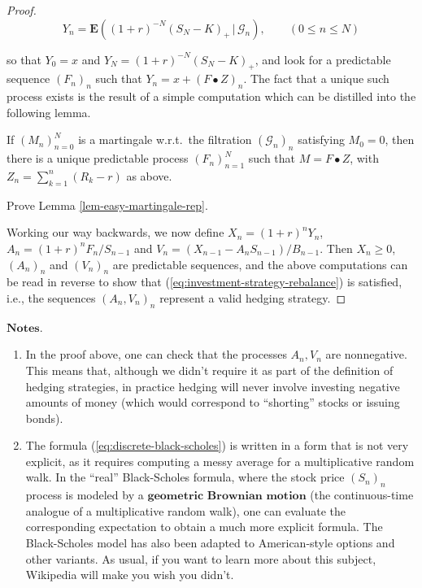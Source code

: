 \begin{proof}
\[
Y_n = \mathbf{E}\left((1+r)^{-N}(S_N-K)_+\,|\,\mathcal{G}_n\right), \qquad (0\le n\le N)
\]

\noindent so that $Y_0 = x$ and $Y_N = (1+r)^{-N} (S_N-K)_+$,
and look for a predictable sequence $(F_n)_n$ such
that $Y_n = x + (F\bullet Z)_n$. The fact that a
unique such process exists is the result of a simple
computation which can be distilled into the following
lemma.

\begin{lem}
\label{lem-easy-martingale-rep}
If $(M_n)_{n=0}^N$ is a martingale w.r.t.\ the
filtration $(\mathcal{G}_n)_n$ satisfying $M_0 = 0$,
then there is a unique predictable process
$(F_n)_{n=1}^N$ such that $M = F\bullet Z$, with
$Z_n=\sum_{k=1}^n (R_k-r)$ as above.
\end{lem}

\begin{xexercise}
Prove Lemma \ref{lem-easy-martingale-rep}.
\end{xexercise}

\noindent Working our way backwards, we now define
$X_n = (1+r)^n Y_n$, $A_n = (1+r)^n F_n/S_{n-1}$ and
$V_n = (X_{n-1}-A_n S_{n-1})/B_{n-1}$. Then
$X_n\ge 0$, $(A_n)_n$ and $(V_n)_n$ are predictable
sequences, and the above computations can be read in
reverse to show that
(\ref{eq:investment-strategy-rebalance}) is satisfied,
i.e., the sequences $(A_n, V_n)_n$ represent a valid
hedging strategy.
\end{proof}

\noindent $\textbf{Notes.}$

\begin{enumerate}[label=\arabic*.]
\item In the proof above, one can check that the processes
$A_n, V_n$ are nonnegative. This means that, although
we didn't require it as part of the definition of
hedging strategies, in practice hedging will never
involve investing negative amounts of money (which
would correspond to ``shorting'' stocks or issuing
bonds).

\item The formula (\ref{eq:discrete-black-scholes}) is written
in a form that is not very explicit, as it requires
computing a messy average for a multiplicative random
walk. In the ``real'' Black-Scholes formula, where the
stock price $(S_n)_n$ process is modeled by a
$\textbf{geometric Brownian motion}$ (the
continuous-time analogue of a multiplicative random
walk), one can evaluate the corresponding expectation
to obtain a much more explicit formula. The
Black-Scholes model has also been adapted to
American-style options and other variants. As usual,
if you want to learn more about this subject,
Wikipedia will make you wish you didn't.
\end{enumerate}

